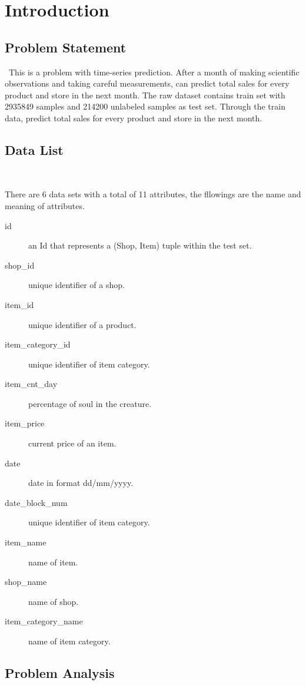 
\section{Introduction}\label{sec-intro}

\subsection{Problem Statement}
\
This is a problem with time-series prediction.
After a month of making scientific observations 
and taking careful measurements, 
can predict total sales for every product and store in the next month.
The raw dataset contains train set with 2935849 
samples and 214200 unlabeled samples as test set.
Through the train data, predict total sales for every product and store in the 
next month.


\subsection{Data List}
\

There are 6 data sets with a total of 11 attributes,
the fllowings are the  
name and meaning of attributes.


\begin{description}
	\item[id]  an Id that represents a (Shop, Item) tuple within the test set.
	\item[shop\_id] unique identifier of a shop.
	\item[item\_id] unique identifier of a product.
	\item[item\_category\_id] unique identifier of item category.
	\item[item\_cnt\_day] percentage of soul in the creature.
	\item[item\_price] current price of an item.
	\item[date] date in format dd/mm/yyyy.
	\item[date\_block\_num] unique identifier of item category.
	\item[item\_name] name of item.
	\item[shop\_name] name of shop.
	\item[item\_category\_name] name of item category.
\end{description}


\subsection{Problem Analysis}


